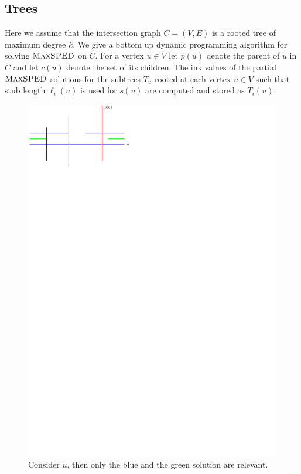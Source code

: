 \documentclass[a4paper,english,numberwithinsect]{eurocg18}
\newcommand{\martin}[1]{\todo[inline,color=blue!40]{MN: #1}}
\newcommand{\fabian}[1]{\todo[inline,color=pink!40]{FK: #1}}
\newcommand{\maxsped}{\ensuremath{\textsc{MaxSPED}}\xspace}
\begin{document}
%

\subsection{Trees}
Here we assume that the intersection graph $ C = (V,E) $ is a rooted tree of maximum degree $ k $. We give a bottom up dynamic programming algorithm for solving \maxsped on $ C $. For a vertex $ u \in V $ let $ p(u) $ denote the parent of $ u $ in $ C $ and let $ c(u) $ denote the set of its children. The ink values of the partial \maxsped solutions for the subtrees $T_u$ rooted at each vertex $ u \in V $ such that stub length $ \ell_i(u) $ is used for $s(u)$ are computed and stored as $ T_i(u) $.

\begin{figure}[tbp]
	\centering
	\includegraphics{two_solutions_needed}
	\caption{Consider $ u $, then only the blue and the green solution are relevant.}
	\label{fig:two_solutions}
\end{figure}
\end{document}

